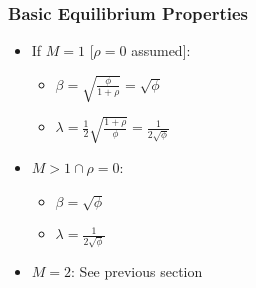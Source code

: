 \documentclass{scrartcl}
\def\chil{\ensuremath{\rho}}
\begin{document}
	 			\subsubsection*{Basic Equilibrium Properties}
	 				\begin{multicols}{2}
 						\begin{itemize}
		 					\item If $M = 1 $ [$ \chil = 0 $ assumed]:
		 						\begin{itemize}
		 							\item $ \beta  = \sqrt{\frac{\phi}{1 + \chil}} = \sqrt\phi  $ 
		 							\item $ \lambda = \frac{1}{2} \sqrt{\frac{1 + \chil}{\phi}} = \frac{1}{2\sqrt\phi} $
		 						\end{itemize}
		 					\item $ M > 1 \cap \chil = 0 $:
		 						\begin{itemize}
		 							\item $ \beta  = \sqrt\phi  $ 
		 							\item $ \lambda = \frac{1}{2\sqrt\phi} $
		 						\end{itemize}
		 					\item $ M = 2 $: See previous section
		 				\end{itemize}
	 				\end{multicols}
\end{document}
